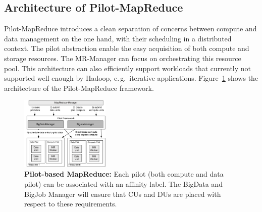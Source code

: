\documentclass{acm_proc_article-sp}
\newcommand{\alnote}[1]{ {\textcolor{blue} { ***andreL: #1 }}}
\newcommand{\alnote}[1]{}
\newcommand{\upp}{\vspace*{-0.5em}}
\newcommand{\pilotmapreduce}{Pilot-MapReduce\xspace}
\newcommand{\mrmg}{MR-Manager\xspace}
\begin{document}


\upp
\subsection{Architecture of \pilotmapreduce}
\pilotmapreduce introduces a clean separation of concerns between
compute and data management on the one hand, with their scheduling in
a distributed context. The pilot abstraction enable the easy
acquisition of both compute and storage resources. The \mrmg can
focus on orchestrating this resource pool. This architecture can also
efficiently support workloads that currently not supported well
enough by Hadoop, e.\,g.\ iterative
applications. Figure~\ref{fig:figures_mapreduce-pilotdata} shows the
architecture of the \pilotmapreduce framework.

\begin{figure}[t]
	\centering
	\includegraphics[width=0.38\textwidth]{figures/mapreduce-pilotdata.pdf}
	\caption{\textbf{Pilot-based MapReduce:} Each pilot (both compute and data 
	pilot) can be associated with an affinity label. The BigData and BigJob 
	Manager will ensure that CUs and DUs are placed with respect to these 
	requirements.\upp}
	\label{fig:figures_mapreduce-pilotdata}
\end{figure}
\end{document}
